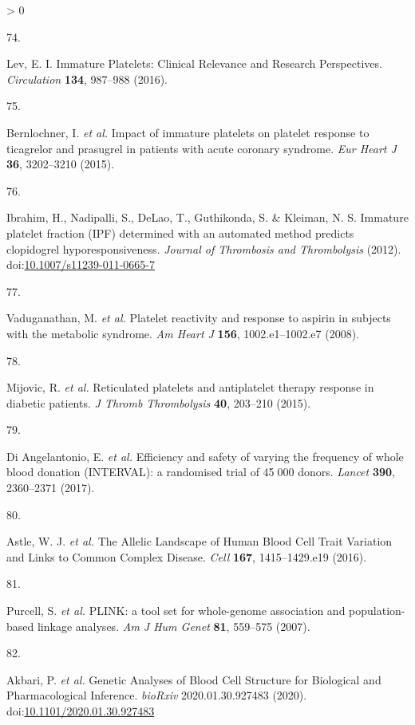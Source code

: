 \documentclass[11pt,twoside]{bristolthesis}
\newlength{\cslhangindent}
\newlength{\csllabelwidth}
\newenvironment{CSLReferences}[2] %
 {%
  \setlength{\parindent}{0pt}
  \ifodd #1 \everypar{\setlength{\hangindent}{\cslhangindent}}\ignorespaces\fi
  \ifnum #2 > 0
  \setlength{\parskip}{#2\baselineskip}
  \fi
 }%
 {}
\newcommand{\CSLLeftMargin}[1]{\parbox[t]{\csllabelwidth}{#1}}
\newcommand{\CSLRightInline}[1]{\parbox[t]{\linewidth - \csllabelwidth}{#1}\break}
\begin{document}
\begin{CSLReferences}{0}{0}
\leavevmode\hypertarget{ref-Lev2016a}{}%
\CSLLeftMargin{74. }
\CSLRightInline{Lev, E. I. {Immature Platelets: Clinical Relevance and Research Perspectives}. \emph{Circulation} \textbf{134}, 987--988 (2016).}

\leavevmode\hypertarget{ref-Bernlochner2015a}{}%
\CSLLeftMargin{75. }
\CSLRightInline{Bernlochner, I. \emph{et al.} {Impact of immature platelets on platelet response to ticagrelor and prasugrel in patients with acute coronary syndrome}. \emph{Eur Heart J} \textbf{36}, 3202--3210 (2015).}

\leavevmode\hypertarget{ref-Ibrahim2012}{}%
\CSLLeftMargin{76. }
\CSLRightInline{Ibrahim, H., Nadipalli, S., DeLao, T., Guthikonda, S. \& Kleiman, N. S. {Immature platelet fraction (IPF) determined with an automated method predicts clopidogrel hyporesponsiveness}. \emph{Journal of Thrombosis and Thrombolysis} (2012). doi:\href{https://doi.org/10.1007/s11239-011-0665-7}{10.1007/s11239-011-0665-7}}

\leavevmode\hypertarget{ref-Vaduganathan2008a}{}%
\CSLLeftMargin{77. }
\CSLRightInline{Vaduganathan, M. \emph{et al.} {Platelet reactivity and response to aspirin in subjects with the metabolic syndrome}. \emph{Am Heart J} \textbf{156}, 1002.e1--1002.e7 (2008).}

\leavevmode\hypertarget{ref-Mijovic2015a}{}%
\CSLLeftMargin{78. }
\CSLRightInline{Mijovic, R. \emph{et al.} {Reticulated platelets and antiplatelet therapy response in diabetic patients}. \emph{J Thromb Thrombolysis} \textbf{40}, 203--210 (2015).}

\leavevmode\hypertarget{ref-DiAngelantonio2017}{}%
\CSLLeftMargin{79. }
\CSLRightInline{Di Angelantonio, E. \emph{et al.} {Efficiency and safety of varying the frequency of whole blood donation (INTERVAL): a randomised trial of 45 000 donors}. \emph{Lancet} \textbf{390}, 2360--2371 (2017).}

\leavevmode\hypertarget{ref-Astle2016}{}%
\CSLLeftMargin{80. }
\CSLRightInline{Astle, W. J. \emph{et al.} {The Allelic Landscape of Human Blood Cell Trait Variation and Links to Common Complex Disease}. \emph{Cell} \textbf{167}, 1415--1429.e19 (2016).}

\leavevmode\hypertarget{ref-Purcell2007a}{}%
\CSLLeftMargin{81. }
\CSLRightInline{Purcell, S. \emph{et al.} {PLINK: a tool set for whole-genome association and population-based linkage analyses}. \emph{Am J Hum Genet} \textbf{81}, 559--575 (2007).}

\leavevmode\hypertarget{ref-Akbari2020}{}%
\CSLLeftMargin{82. }
\CSLRightInline{Akbari, P. \emph{et al.} {Genetic Analyses of Blood Cell Structure for Biological and Pharmacological Inference}. \emph{bioRxiv} 2020.01.30.927483 (2020). doi:\href{https://doi.org/10.1101/2020.01.30.927483}{10.1101/2020.01.30.927483}}


\end{CSLReferences}
\end{document}
